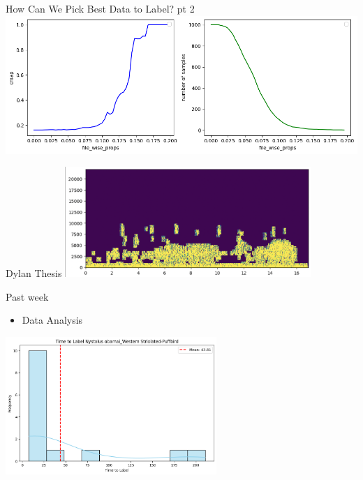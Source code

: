 \begin{frame}{How Can We Pick Best Data to Label? pt 2}
    \centering
    \includegraphics[height=0.9\textheight,width=1\textwidth,keepaspectratio]{images/aid/image (4).png}
\end{frame}

\begin{frame}{Dylan Thesis}
    \centering
    \includegraphics[height=0.7\textheight,width=0.7\textwidth,keepaspectratio]{images/aid/dylan-aid-2-7.png}
\end{frame}


\begin{frame}{Past week}  
    \begin{itemize}
        \item Data Analysis
    \end{itemize}
    \centering
    \includegraphics[width=0.6\textwidth]{data analysis.png}  
\end{frame}

